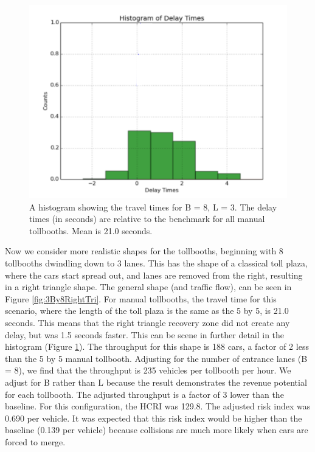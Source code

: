\documentclass[a4paper, 11pt]{article}
\begin{document}
\begin{figure}
\begin{center}
\includegraphics[scale=0.30]{Images/38hist.png}
\caption{A histogram showing the travel times for B = 8, L = 3. The delay times (in seconds) are relative to the benchmark for all manual tollbooths. Mean is 21.0 seconds.}
\label{fig:manual38}
\end{center}
\end{figure}


Now we consider more realistic shapes for the tollbooths, beginning with 8 tollbooths dwindling down to 3 lanes. 
This has the shape of a classical toll plaza, where the cars start spread out, and lanes are removed from the right, resulting in a right triangle shape. 
The general shape (and traffic flow), can be seen in Figure \ref{fig:3By8RightTri}. For manual tollbooths, the travel time for this scenario, where the length of the toll plaza is the same as the 5 by 5, is 21.0 seconds. This means that the right triangle recovery zone did not create any delay, but was 1.5 seconds faster. 
This can be scene in further detail in the histogram (Figure \ref{fig:manual38}). The throughput for this shape is 188 cars, a factor of 2 less than the 5 by 5 manual tollbooth. Adjusting for the number of entrance lanes (B = 8), we find that the throughput is 235 vehicles per tollbooth per hour. We adjust for B rather than L because the result demonstrates the revenue potential for each tollbooth. The adjusted throughput is a factor of 3 lower than the baseline. For this configuration, the HCRI was 129.8. The adjusted risk index was 0.690 per vehicle. It was expected that this risk index would be higher than the baseline (0.139 per vehicle) because collisions are much more likely when cars are forced to merge. 
\end{document}
